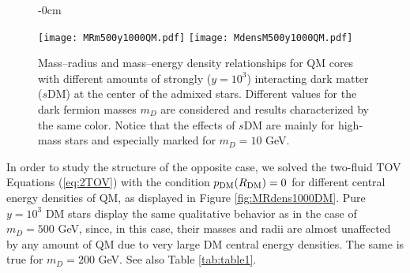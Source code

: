 \documentclass[universe,article,accept,moreauthors,pdftex]{Definitions/mdpi}
\begin{document}
\begin{figure}[H]\ContinuedFloat


\begin{adjustwidth}{-\extralength}{0cm}
\centering %

{\texttt{[image: MRm500y1000QM.pdf]}
	  \texttt{[image: MdensM500y1000QM.pdf]}}
\end{adjustwidth}
\caption{Mass--radius and mass--energy density relationships for QM cores with different amounts of strongly ($y=10^{3}$) interacting dark matter ($s$DM) at the center of the admixed stars. Different values for the dark fermion masses $m_{D}$ are considered and results characterized by the same color. Notice that the effects of $s$DM are mainly for high-mass stars and especially marked for $m_{D}=10$ GeV.}
\label{fig:MRdens1000QM}

\end{figure}



In order to study the structure of the opposite case, we solved the two-fluid TOV Equations (\ref{eq:2TOV}) with the condition $p_{\rm DM}(R_{\rm DM})=0$ for different central energy densities of QM, as displayed in Figure \ref{fig:MRdens1000DM}. Pure $y=10^{3}$ DM stars display the same qualitative behavior as in the case of $m_{D}=500$ GeV, since, in this case, their masses and radii are almost unaffected by any amount of QM due to very large DM central energy densities. The same is true for $m_{D}=200$ GeV. See also Table \ref{tab:table1}. 
\end{document}
